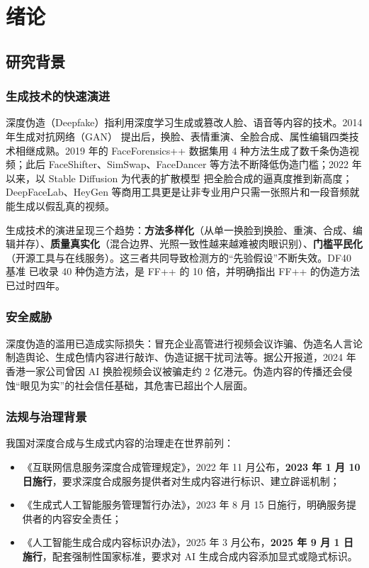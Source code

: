 \section{绪论}

\subsection{研究背景}

\subsubsection{生成技术的快速演进}

深度伪造（Deepfake）指利用深度学习生成或篡改人脸、语音等内容的技术。2014 年生成对抗网络（GAN）\cite{goodfellow2014gan} 提出后，换脸、表情重演、全脸合成、属性编辑四类技术相继成熟。2019 年的 FaceForensics++ 数据集用 4 种方法生成了数千条伪造视频\cite{rossler2019ffpp}；此后 FaceShifter\cite{li2020faceshifter}、SimSwap、FaceDancer 等方法不断降低伪造门槛；2022 年以来，以 Stable Diffusion 为代表的扩散模型\cite{rombach2022ldm} 把全脸合成的逼真度推到新高度；DeepFaceLab、HeyGen 等商用工具更是让非专业用户只需一张照片和一段音频就能生成以假乱真的视频。

生成技术的演进呈现三个趋势：\textbf{方法多样化}（从单一换脸到换脸、重演、合成、编辑并存）、\textbf{质量真实化}（混合边界、光照一致性越来越难被肉眼识别）、\textbf{门槛平民化}（开源工具与在线服务）。这三者共同导致检测方的“先验假设”不断失效。DF40 基准\cite{yan2024df40} 已收录 40 种伪造方法，是 FF++ 的 10 倍，并明确指出 FF++ 的伪造方法已过时四年。

\subsubsection{安全威胁}

深度伪造的滥用已造成实际损失：冒充企业高管进行视频会议诈骗、伪造名人言论制造舆论、生成色情内容进行敲诈、伪造证据干扰司法等。据公开报道，2024 年香港一家公司曾因 AI 换脸视频会议被骗走约 2 亿港元。伪造内容的传播还会侵蚀“眼见为实”的社会信任基础，其危害已超出个人层面。

\subsubsection{法规与治理背景}

我国对深度合成与生成式内容的治理走在世界前列：

\begin{itemize}
  \item 《互联网信息服务深度合成管理规定》，2022 年 11 月公布，\textbf{2023 年 1 月 10 日施行}，要求深度合成服务提供者对生成内容进行标识、建立辟谣机制\cite{cac2022deepsynth}；
  \item 《生成式人工智能服务管理暂行办法》，2023 年 8 月 15 日施行，明确服务提供者的内容安全责任\cite{cac2023genai}；
  \item 《人工智能生成合成内容标识办法》，2025 年 3 月公布，\textbf{2025 年 9 月 1 日施行}，配套强制性国家标准，要求对 AI 生成合成内容添加显式或隐式标识\cite{cac2025label}。
\end{itemize}

